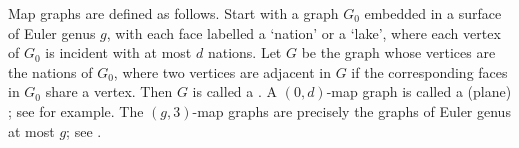 
 Map graphs are defined as follows. Start with a graph $G_0$ embedded in a surface of Euler genus $g$, with each face labelled a `nation' or a `lake', where each vertex of $G_0$ is incident with at most $d$ nations. Let $G$ be the graph whose vertices are the nations of $G_0$, where two vertices are adjacent in $G$ if the corresponding faces in $G_0$ share a vertex. Then $G$ is called a .  A $(0,d)$-map graph is called a (plane) ; see \citep{FLS-SODA12,CGP02} for example. The $(g,3)$-map graphs are precisely the graphs of Euler genus at most $g$; see \citep{dujmovic.eppstein.ea:structure}.






